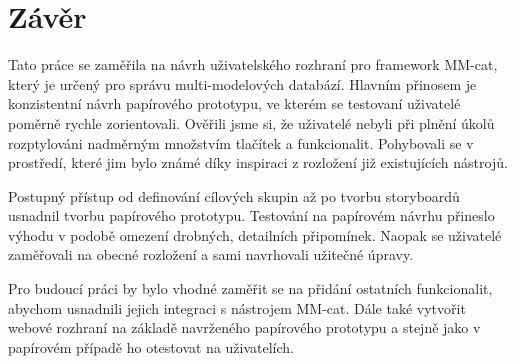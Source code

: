 \chapter*{Závěr}




Tato práce se zaměřila na návrh uživatelského rozhraní pro framework MM-cat, který je určený pro správu multi-modelových databází. Hlavním přinosem je konzistentní návrh papírového prototypu, ve kterém se testovaní uživatelé poměrně rychle zorientovali. Ověřili jsme si, že uživatelé nebyli při plnění úkolů rozptylováni nadměrným množstvím tlačítek a funkcionalit. Pohybovali se v prostředí, které jim bylo známé díky inspiraci z rozložení již existujících nástrojů.

Postupný přístup od definování cílových skupin až po tvorbu storyboardů usnadnil tvorbu papírového prototypu. Testování na papírovém návrhu přineslo výhodu v podobě omezení drobných, detailních připomínek. Naopak se uživatelé zaměřovali na obecné rozložení a sami navrhovali užitečné úpravy.

Pro budoucí práci by bylo vhodné zaměřit se na přidání ostatních funkcionalit, abychom usnadnili jejich integraci s nástrojem MM-cat. Dále také vytvořit webové rozhraní na základě navrženého papírového prototypu a stejně jako v papírovém případě ho otestovat na uživatelích.
